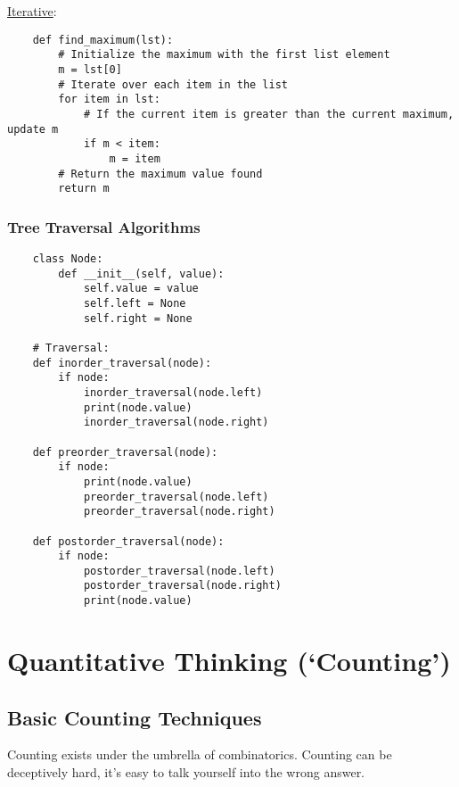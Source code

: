 \documentclass{article}
\begin{document}
            \underline{Iterative}:
            \begin{lstlisting}
    def find_maximum(lst):
        # Initialize the maximum with the first list element
        m = lst[0]
        # Iterate over each item in the list
        for item in lst:
            # If the current item is greater than the current maximum, update m
            if m < item:
                m = item
        # Return the maximum value found
        return m
            \end{lstlisting}

\newpage

        \subsubsection{Tree Traversal Algorithms}
            \begin{lstlisting}
    class Node:
        def __init__(self, value):
            self.value = value
            self.left = None
            self.right = None
            
    # Traversal:            
    def inorder_traversal(node):
        if node:
            inorder_traversal(node.left)
            print(node.value)
            inorder_traversal(node.right)

    def preorder_traversal(node):
        if node:
            print(node.value)
            preorder_traversal(node.left)
            preorder_traversal(node.right)

    def postorder_traversal(node):
        if node:
            postorder_traversal(node.left)
            postorder_traversal(node.right)
            print(node.value)
            \end{lstlisting}

\newpage
\setcounter{example}{0}
\section{Quantitative Thinking (`Counting')}
    \subsection{Basic Counting Techniques}
    
        \begin{yap}
            Counting exists under the umbrella of combinatorics. Counting can be deceptively hard, it's easy to talk yourself into the wrong answer.
        \end{yap}
\end{document}

